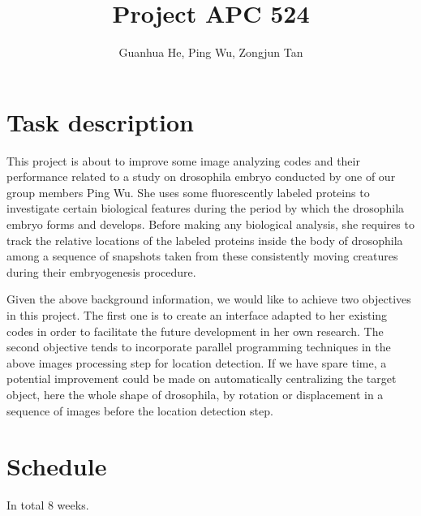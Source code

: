 \documentclass[a4paper,12pt]{article}
\title{Project APC 524}
\author{Guanhua He, Ping Wu, Zongjun Tan}
\theoremstyle{remark}
\numberwithin{equation}{section}
\begin{document}
 \maketitle
	
	
	\section{Task description}
	
	This project is about to improve some image analyzing codes and their performance related to a study on drosophila embryo conducted by one of our group members Ping Wu. She uses some fluorescently labeled proteins to investigate certain biological features during the period by which the drosophila embryo forms and develops. Before making any biological analysis, she requires to track the relative locations of the labeled proteins inside the body of drosophila among a sequence of snapshots taken from these consistently moving creatures during their embryogenesis procedure. 
	
	Given the above background information, we would like to achieve two objectives in this project. The first one is to create an interface adapted to her existing codes in order to facilitate the future development in her own research. The second objective tends to incorporate parallel programming techniques in the above images processing step for location detection. If we have spare time, a potential improvement could be made on automatically centralizing the target object, here the whole shape of drosophila, by rotation or displacement in a sequence of images before the location detection step.
	
	
	\section{Schedule}
	In total 8 weeks.
	
\end{document}
